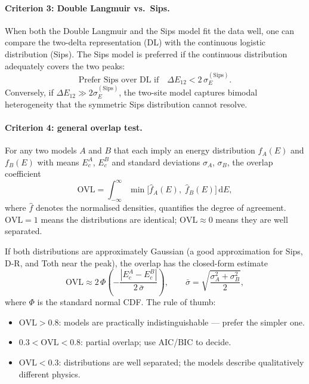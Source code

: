 	\paragraph{Criterion 3: Double Langmuir vs.\ Sips.}

	When both the Double Langmuir and the Sips model fit the data
	well, one can compare the two-delta representation (DL) with the
	continuous logistic distribution (Sips). The Sips model is
	preferred if the continuous distribution adequately covers the
	two peaks:
	\begin{equation}
		\boxed{
			\text{Prefer Sips over DL if}\quad
			\Delta E_{12} < 2\,\sigma_E^{\mathrm{(Sips)}}.
		}
		\label{eq:criterion_DL_vs_S}
	\end{equation}
	Conversely, if $\Delta E_{12} \gg 2\sigma_E^{\mathrm{(Sips)}}$,
	the two-site model captures bimodal heterogeneity that the
	symmetric Sips distribution cannot resolve.

	\paragraph{Criterion 4: general overlap test.}

	For any two models $A$ and $B$ that each imply an energy
	distribution $f_A(E)$ and $f_B(E)$ with means $E_c^{A}$,
	$E_c^{B}$ and standard deviations $\sigma_A$, $\sigma_B$,
	the overlap coefficient
	\begin{equation}
		\mathrm{OVL}
		= \int_{-\infty}^{\infty}
		\min\!\bigl[\hat{f}_A(E),\;\hat{f}_B(E)\bigr]\,\mathrm{d}E,
		\label{eq:OVL}
	\end{equation}
	where $\hat{f}$ denotes the normalised densities, quantifies the
	degree of agreement. $\mathrm{OVL} = 1$ means the distributions
	are identical; $\mathrm{OVL} \approx 0$ means they are well
	separated.

	If both distributions are approximately Gaussian (a good
	approximation for Sips, D-R, and Toth near the peak), the overlap
	has the closed-form estimate
	\begin{equation}
		\mathrm{OVL}
		\approx 2\,\Phi\!\left(
		-\frac{|E_c^A - E_c^B|}{2\,\bar{\sigma}}
		\right),
		\qquad
		\bar{\sigma}
		= \sqrt{\frac{\sigma_A^2 + \sigma_B^2}{2}},
		\label{eq:OVL_gauss}
	\end{equation}
	where $\Phi$ is the standard normal CDF. The rule of thumb:
	\begin{itemize}
		\item $\mathrm{OVL} > 0.8$: models are practically
		indistinguishable --- prefer the simpler one.
		\item $0.3 < \mathrm{OVL} < 0.8$: partial overlap; use
		AIC/BIC to decide.
		\item $\mathrm{OVL} < 0.3$: distributions are well separated;
		the models describe qualitatively different physics.
	\end{itemize}

